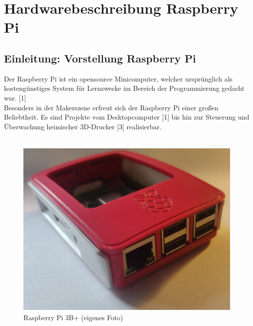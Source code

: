 \documentclass[12pt,a4paper,openany]{scrbook}
\begin{document}
	
\chapter*{Hardwarebeschreibung Raspberry Pi}

\section{Einleitung: Vorstellung Raspberry Pi}
Der Raspberry Pi ist ein opensource Minicomputer, welcher ursprünglich als kostengünstiges System für Lernzwecke im Bereich der Programmierung gedacht war. [1]  \\
Besonders in der Makerszene erfreut sich der Raspberry Pi einer großen Beliebtheit. Es sind Projekte vom Desktopcomputer [1] bis hin zur Steuerung und Überwachung heimischer 3D-Drucker [3] realisierbar.\\ 
\\[3mm]


	\begin{figure}[!h]
	\centering
	\includegraphics[height=250pt]{img/pi_mitgehaeuse.png}
	\caption{Raspberry Pi 3B+ (eigenes Foto)}
	\label{Bildlabel}
\end{figure}	
\end{document}
